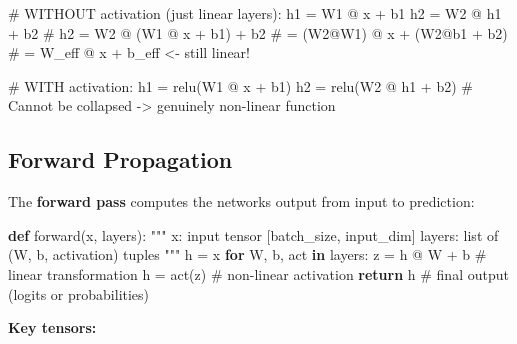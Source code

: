 \documentclass[11pt]{article}
\newenvironment{Shaded}{\begin{snugshade}}{\end{snugshade}}
\newcommand{\CommentTok}[1]{\textcolor[rgb]{0.48,0.49,0.49}{#1}}
\newcommand{\ControlFlowTok}[1]{\textcolor[rgb]{0.99,0.74,0.29}{\textbf{#1}}}
\newcommand{\KeywordTok}[1]{\textcolor[rgb]{0.81,0.81,0.76}{\textbf{#1}}}
\newcommand{\NormalTok}[1]{\textcolor[rgb]{0.81,0.81,0.76}{#1}}
\newcommand{\OperatorTok}[1]{\textcolor[rgb]{0.81,0.81,0.76}{#1}}
\begin{document}
\begin{Shaded}
\begin{Highlighting}[]
\CommentTok{\# WITHOUT activation (just linear layers):}
\NormalTok{h1 }\OperatorTok{=}\NormalTok{ W1 }\OperatorTok{@}\NormalTok{ x }\OperatorTok{+}\NormalTok{ b1}
\NormalTok{h2 }\OperatorTok{=}\NormalTok{ W2 }\OperatorTok{@}\NormalTok{ h1 }\OperatorTok{+}\NormalTok{ b2}
\CommentTok{\# h2 = W2 @ (W1 @ x + b1) + b2}
\CommentTok{\#    = (W2@W1) @ x + (W2@b1 + b2)}
\CommentTok{\#    = W\_eff @ x + b\_eff   \textless{}{-} still linear!}

\CommentTok{\# WITH activation:}
\NormalTok{h1 }\OperatorTok{=}\NormalTok{ relu(W1 }\OperatorTok{@}\NormalTok{ x }\OperatorTok{+}\NormalTok{ b1)}
\NormalTok{h2 }\OperatorTok{=}\NormalTok{ relu(W2 }\OperatorTok{@}\NormalTok{ h1 }\OperatorTok{+}\NormalTok{ b2)}
\CommentTok{\# Cannot be collapsed {-}\textgreater{} genuinely non{-}linear function}
\end{Highlighting}
\end{Shaded}

\subsection{Forward Propagation}\label{forward-propagation}

The \textbf{forward pass} computes the network\textquotesingle s output from input to prediction:


\begin{Shaded}
\begin{Highlighting}[]
\KeywordTok{def}\NormalTok{ forward(x, layers):}
    \CommentTok{"""}
\CommentTok{    x: input tensor [batch\_size, input\_dim]}
\CommentTok{    layers: list of (W, b, activation) tuples}
\CommentTok{    """}
\NormalTok{    h }\OperatorTok{=}\NormalTok{ x}
    \ControlFlowTok{for}\NormalTok{ W, b, act }\KeywordTok{in}\NormalTok{ layers:}
\NormalTok{        z }\OperatorTok{=}\NormalTok{ h }\OperatorTok{@}\NormalTok{ W }\OperatorTok{+}\NormalTok{ b        }\CommentTok{\# linear transformation}
\NormalTok{        h }\OperatorTok{=}\NormalTok{ act(z)           }\CommentTok{\# non{-}linear activation}
    \ControlFlowTok{return}\NormalTok{ h                 }\CommentTok{\# final output (logits or probabilities)}
\end{Highlighting}
\end{Shaded}

\textbf{Key tensors:}
\end{document}
